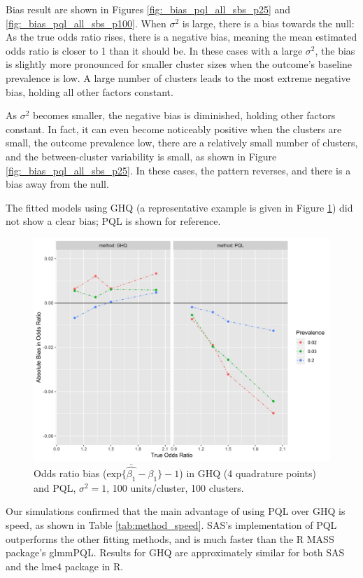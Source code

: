 \documentclass[Afour,times,sagev,doublespace]{sagej}
\begin{document}
Bias result are shown in Figures \ref{fig:_bias_pql_all_sbs_p25} and \ref{fig:_bias_pql_all_sbs_p100}. When $\sigma^2$ is large, there is a bias towards the null: As the true odds ratio rises, there is a negative bias, meaning the mean estimated odds ratio is closer to 1 than it should be. In these cases with a large $\sigma^2$, the bias is slightly more pronounced for smaller cluster sizes when the outcome's baseline prevalence is low. A large number of clusters leads to the most extreme negative bias, holding all other factors constant.

As $\sigma^2$ becomes smaller, the negative bias is diminished, holding other factors constant. In fact, it can even become noticeably positive when the clusters are small, the outcome prevalence low, there are a relatively small number of clusters, and the between-cluster variability is small, as shown in Figure \ref{fig:_bias_pql_all_sbs_p25}. In these cases, the pattern reverses, and there is a bias away from the null.

The fitted models using GHQ (a representative example is given in Figure \ref{fig:_bias_pql_ghq4}) did not show a clear bias; PQL is shown for reference.

\begin{figure}
\centering
\includegraphics[width=\linewidth]{_bias_pql_ghq4.png}
  \caption{Odds ratio bias ($\text{exp} \{ \bar{\hat{\beta_1}} - \beta_1 \} - 1$) in GHQ (4 quadrature points) and PQL, $\sigma^2=1$, 100 units/cluster, 100 clusters.}
  \label{fig:_bias_pql_ghq4}
\end{figure}

Our simulations confirmed that the main advantage of using PQL over GHQ is speed, as shown in Table \ref{tab:method_speed}. SAS's implementation of PQL outperforms the other fitting methods, and is much faster than the R MASS package's glmmPQL. Results for GHQ are approximately similar for both SAS and the lme4 package in R.
\end{document}
